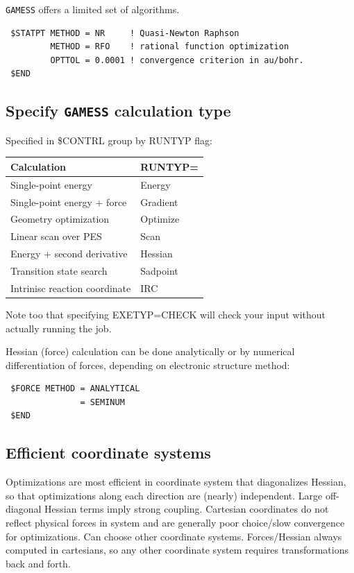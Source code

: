 \documentclass[11pt]{article}
\begin{document}
\texttt{GAMESS} offers a limited set of algorithms.
\begin{verbatim}
 $STATPT METHOD = NR     ! Quasi-Newton Raphson
         METHOD = RFO    ! rational function optimization
         OPTTOL = 0.0001 ! convergence criterion in au/bohr.
 $END
\end{verbatim}

\subsection{Specify \texttt{GAMESS} calculation type}
\label{sec:orgd673cb7}
Specified in \$CONTRL group by RUNTYP flag:

\begin{center}
\begin{tabular}{ll}
Calculation & RUNTYP=\\
\hline
Single-point energy & Energy\\
Single-point energy + force & Gradient\\
Geometry optimization & Optimize\\
Linear scan over PES & Scan\\
Energy + second derivative & Hessian\\
Transition state search & Sadpoint\\
Intrinisc reaction coordinate & IRC\\
\end{tabular}
\end{center}

Note too that specifying EXETYP=CHECK will check your input without actually running the job.

Hessian (force) calculation can be done analytically or by numerical differentiation of forces, depending on electronic structure method:
\begin{verbatim}
 $FORCE METHOD = ANALYTICAL
               = SEMINUM
 $END
\end{verbatim}


\subsection{Efficient coordinate systems}
\label{sec:org77f943f}
Optimizations are most efficient in coordinate system that diagonalizes Hessian, so that optimizations along each direction are (nearly) independent.  Large off-diagonal Hessian terms imply strong coupling.  Cartesian coordinates do not reflect physical forces in system and are generally poor choice/slow convergence for optimizations. Can choose other coordinate systems. Forces/Hessian always computed in cartesians, so any other coordinate system requires transformations back and forth.
\end{document}
